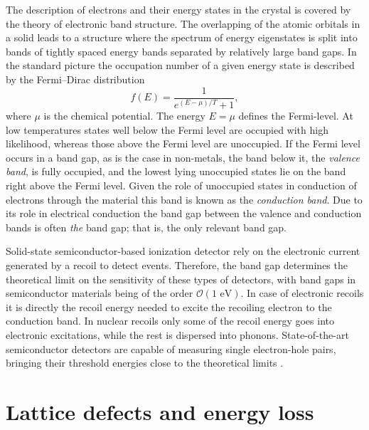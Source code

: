 \documentclass[b5paper, 10pt, twoside]{book}
\begin{document}
The description of electrons and their energy states in the crystal is covered by the theory of electronic band structure. The overlapping of the atomic orbitals in a solid leads to a structure where the spectrum of energy eigenstates is split into bands of tightly spaced energy bands separated by relatively large band gaps. In the standard picture the occupation number of a given energy state is described by the Fermi--Dirac distribution
\begin{equation}
    f(E)=\frac{1}{e^{(E-\mu)/T}+1},
\end{equation}
where $\mu$ is the chemical potential. The energy $E=\mu$ defines the Fermi-level. At low temperatures states well below the Fermi level are occupied with high likelihood, whereas those above the Fermi level are unoccupied. If the Fermi level occurs in a band gap, as is the case in non-metals, the band below it, the \emph{valence band}, is fully occupied, and the lowest lying unoccupied states lie on the band right above the Fermi level. Given the role of unoccupied states in conduction of electrons through the material this band is known as the \emph{conduction band}. Due to its role in electrical conduction the band gap between the valence and conduction bands is often \emph{the} band gap; that is, the only relevant band gap.

Solid-state semiconductor-based ionization detector rely on the electronic current generated by a recoil to detect events. Therefore, the band gap determines the theoretical limit on the sensitivity of these types of detectors, with band gaps in semiconductor materials being of the order $\mathcal{O}(1\text{ eV})$. In case of electronic recoils it is directly the recoil energy needed to excite the recoiling electron to the conduction band. In nuclear recoils only some of the recoil energy goes into electronic excitations, while the rest is dispersed into phonons. State-of-the-art semiconductor detectors are capable of measuring single electron-hole pairs, bringing their threshold energies close to the theoretical limits \parencites{RomaniEtAl2018, CrislerEtAl2018, EDELWEISS2020}.

\section{Lattice defects and energy loss}
\end{document}
